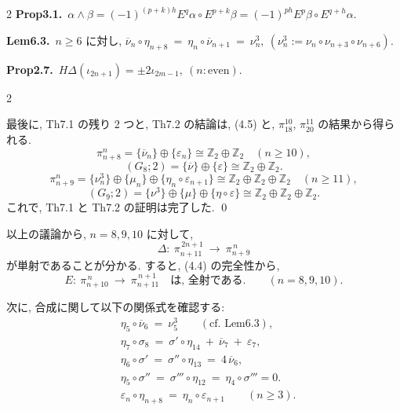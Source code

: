 \documentclass[10pt, leqno]{ltjsarticle}
\newcommand{\ov}[1]{\overline{#1}}
\newcommand{\gen}[1]{\{#1\}}       %
\newcommand{\pit}[2]{\pi_{#1}^{#2}}
\numberwithin{equation}{section}
\theoremstyle{plain}
\theoremstyle{definition}
\theoremstyle{remark}
\begin{document}
\begin{paracol}{2}
\noindent
\textbf{Prop3.1.}\
\(
\alpha \wedge \beta
= (-1)^{(p+k)h} E^{q}\alpha \circ E^{p+k}\beta
= (-1)^{ph} E^{p}\beta \circ E^{q+h}\alpha .
\)

\noindent
\textbf{Lem6.3.}\
\(n\ge6\) に対し,
\(
\overline\nu_n\circ \eta_{n+8}\ 
=\ \eta_n\circ \overline\nu_{n+1}\ =\ \nu_n^{3},
\ (\nu_n^{3}:=\nu_n\circ \nu_{n+3}\circ \nu_{n+6}).
\)

\noindent
\textbf{Prop2.7.}\
\(H\Delta(\iota_{2n+1}) = \pm2\iota_{2m-1},\ (n:\text{even})\).






\end{paracol}

\begin{paracol}{2}

最後に,  Th7.1 の残り 2 つと, Th7.2 の結論は, 
(4.5) と, \(\pit{18}{10}\), \(\pit{20}{11}\) の結果から得られる. 
\[
\pit{n+8}{n}=\gen{\ov{\nu}_{n}}\oplus\gen{\varepsilon_{n}}\cong 
\mathbb Z_{2}\oplus\mathbb Z_{2}\quad (n\ge10),
\]
\[
(G_{8};2)=
\gen{\ov{\nu}}\oplus\gen{\varepsilon}\cong\mathbb Z_{2}\oplus\mathbb Z_{2}.
\]
\[
\pit{n+9}{n}=
\gen{\nu_{n}^{3}}\oplus\gen{\mu_{n}}\oplus\gen{\eta_{n}\circ\varepsilon_{n+1}}
\cong\mathbb Z_{2}\oplus\mathbb Z_{2}\oplus\mathbb Z_{2}\quad (n\ge11),
\]
\[
(G_{9};2)=
\gen{\nu^{3}}\oplus\gen{\mu}\oplus\gen{\eta\circ\varepsilon}\cong\mathbb Z_{2}\oplus\mathbb Z_{2}\oplus\mathbb Z_{2}.
\]
これで,  Th7.1 と Th7.2 の証明は完了した. 
\qed

以上の議論から, \(n=8,9,10\) に対して,
\[
\Delta:\ \pit{n+11}{\,2n+1}\ \longrightarrow\ \pit{n+9}{\,n}
\]
が単射であることが分かる. すると, (4.4) の完全性から,
\begin{equation}\label{eq:72}
E:\ \pit{n+10}{\,n}\ \longrightarrow\ \pit{n+11}{\,n+1}
\quad\text{は, 全射である.}\qquad(n=8,9,10).
\end{equation}

次に, 合成に関して以下の関係式を確認する:
\begin{align}
& \eta_{5}\circ\ov{\nu}_{6}\ =\ \nu_{5}^{3}\qquad(\text{cf.\  Lem}6.3), \\
& \eta_{7}\circ\sigma_{8}\ =\ \sigma'\circ\eta_{14}\ +\ \ov{\nu}_{7}\ +\ \varepsilon_{7}, \\
& \eta_{6}\circ\sigma'\ =\ \sigma''\circ\eta_{13}\ =\ 4\,\ov{\nu}_{6}, \nonumber\\
& \eta_5\circ\sigma'' \ =\ \sigma'''\circ\eta_{12}\ =\ \eta_4\circ\sigma''' = 0. \nonumber\\
& \varepsilon_{n}\circ\eta_{n+8}\ =\ \eta_{n}\circ\varepsilon_{n+1}\qquad(n\ge3).
\end{align}


\end{paracol}
\end{document}
